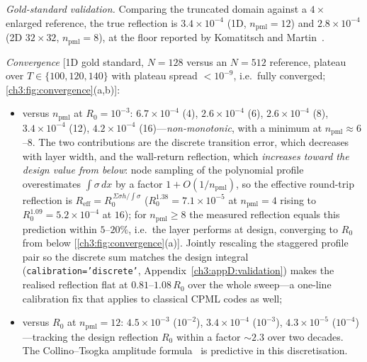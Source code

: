 \emph{Gold-standard validation.}  Comparing the truncated domain against
a $4\times$ enlarged reference, the true reflection is $3.4\times10^{-4}$
(1D, $n_{\mathrm{pml}}=12$) and $2.8\times10^{-4}$ (2D $32\times32$,
$n_{\mathrm{pml}}=8$), at the floor reported by Komatitsch and
Martin~\cite{komatitsch2007unsplit}.

\emph{Convergence} [1D gold standard, $N=128$ versus an $N=512$
reference, plateau over $T\in\{100,120,140\}$ with plateau spread
$<10^{-9}$, i.e.\ fully converged; \ref{ch3:fig:convergence}(a,b)]:
\begin{itemize}
\item versus $n_{\mathrm{pml}}$ at $R_0=10^{-3}$: $6.7\times10^{-4}$ (4),
  $2.6\times10^{-4}$ (6), $2.6\times10^{-4}$ (8), $3.4\times10^{-4}$ (12),
  $4.2\times10^{-4}$ (16)---\emph{non-monotonic}, with a minimum at
  $n_{\mathrm{pml}}\approx6$--$8$.  The two contributions are the
  discrete transition error, which decreases with layer width, and the
  wall-return reflection, which \emph{increases toward the design value
  from below}: node sampling of the polynomial profile overestimates
  $\int\sigma\,dx$ by a factor $1+O(1/n_{\mathrm{pml}})$, so the
  effective round-trip reflection is
  $R_{\mathrm{eff}}=R_0^{\,\Sigma\sigma h/\!\int\!\sigma}$
  ($R_0^{1.38}=7.1\times10^{-5}$ at $n_{\mathrm{pml}}=4$ rising to
  $R_0^{1.09}=5.2\times10^{-4}$ at $16$); for
  $n_{\mathrm{pml}}\ge8$ the measured reflection equals this
  prediction within $5$--$20\%$, i.e.\ the layer performs at design,
  converging to $R_0$ from below [\ref{ch3:fig:convergence}(a)].
  Jointly rescaling the staggered profile pair so the discrete sum
  matches the design integral (\texttt{calibration='discrete'},
  Appendix~\ref{ch3:appD:validation}) makes the realised reflection flat at
  $0.81$--$1.08\,R_0$ over the whole sweep---a one-line calibration fix
  that applies to classical CPML codes as well;
\item versus $R_0$ at $n_{\mathrm{pml}}=12$: $4.5\times10^{-3}$
  ($10^{-2}$), $3.4\times10^{-4}$ ($10^{-3}$), $4.3\times10^{-5}$
  ($10^{-4}$)---tracking the design reflection $R_0$ within a factor
  ${\sim}2.3$ over two decades.  The Collino--Tsogka amplitude
  formula~\cite{collino2001pml} is predictive in this discretisation.
\end{itemize}

